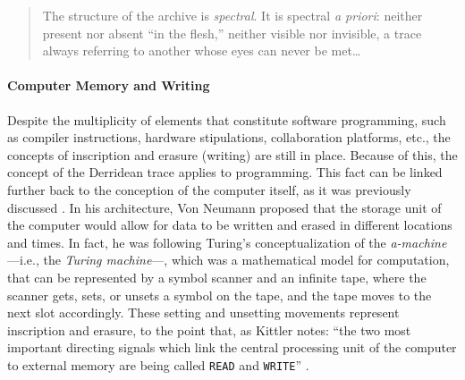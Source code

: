 \begin{quote}
	The structure of the archive is \textit{spectral}. It is spectral \textit{a priori}: neither present nor absent ``in the flesh,'' neither visible nor invisible, a trace always referring to another whose eyes can never be met\dots
\parencite[54]{Der95:Arc}
\end{quote} %

\paragraph{Computer Memory and Writing}
Despite the multiplicity of elements that constitute software programming, such as compiler instructions, hardware stipulations, collaboration platforms, etc., the concepts of inscription and erasure (writing) are still in place. Because of this, the concept of the Derridean trace applies to programming. This fact can be linked further back to the conception of the computer itself, as it was previously discussed . In his architecture, Von Neumann proposed that the storage unit of the computer would allow for data to be written and erased in different locations and times. In fact, he was following Turing's conceptualization of the \textit{a-machine} ---i.e., the \textit{Turing machine}---, which was a mathematical model for computation, that can be represented by a symbol scanner and an infinite tape, where the scanner gets, sets, or unsets a symbol on the tape, and the tape moves to the next slot accordingly. These setting and unsetting movements represent inscription and erasure, to the point that, as Kittler notes: ``the two most important directing signals which link the central processing unit of the computer to external memory are being called \texttt{READ} and \texttt{WRITE}'' \parencite[131]{Ern13:Dig}.

